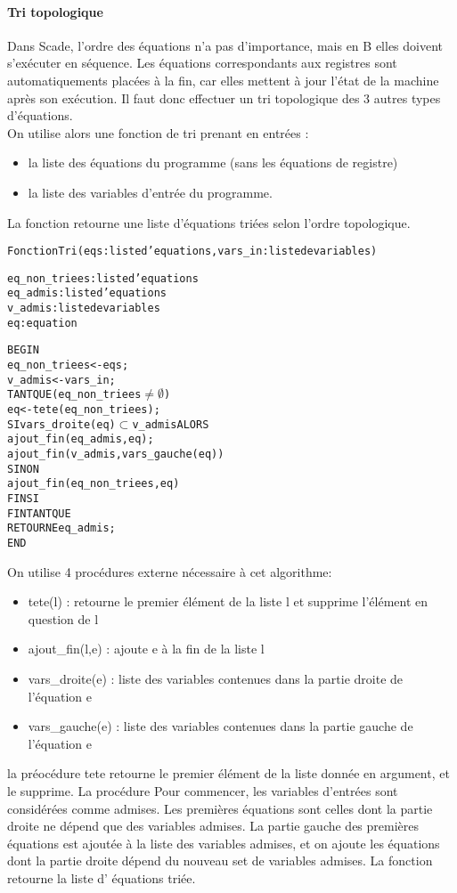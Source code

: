 \paragraph{Tri topologique}
Dans Scade, l'ordre des équations n'a pas d'importance, mais en B elles doivent
s'exécuter en séquence. Les équations correspondants aux registres sont
automatiquements placées à la fin, car elles mettent à jour l'état de la machine
après son exécution. Il faut donc effectuer un tri topologique des 3 autres
types d'équations.\\
On utilise alors une fonction de tri prenant en entrées :
\begin{itemize}
\item la liste des équations du programme (sans les équations de registre)
\item la liste des variables d'entrée du programme.
\end{itemize}
La fonction retourne une liste d'équations triées selon l'ordre
topologique.

\begin{alltt}
Fonction Tri (eqs: liste d'equations, vars\_in: liste de variables)

eq\_non\_triees : liste d'equations
eq\_admis : liste d'equations
v\_admis : liste de variables 
eq : equation

BEGIN
 eq\_non\_triees <- eqs;
 v\_admis <- vars\_in;
 TANT QUE (eq\_non\_triees \(\neq \emptyset \)) 
    eq <- tete(eq\_non\_triees);
    SI vars\_droite(eq) \(\subset\) v\_admis ALORS
       ajout\_fin(eq\_admis, eq);
       ajout\_fin(v\_admis, vars\_gauche(eq))
    SINON
       ajout\_fin(eq\_non\_triees, eq)
    FIN SI
 FIN TANT QUE
 RETOURNE eq\_admis;
END

\end{alltt}

On utilise 4 procédures externe nécessaire à cet algorithme:
\begin{itemize}
\item tete(l) : retourne le premier élément de la liste l et supprime l'élément
  en question de l
\item ajout\_fin(l,e) : ajoute e à la fin de la liste l
\item vars\_droite(e) : liste des variables contenues dans la partie droite de
  l'équation e
\item vars\_gauche(e) : liste des variables contenues dans la partie gauche de
  l'équation e
\end{itemize}
la préocédure tete retourne le premier élément de la liste donnée en argument,
et le supprime. La procédure 
Pour commencer, les variables d'entrées sont considérées comme admises. Les
premières équations sont celles dont la partie droite ne dépend que des
variables admises. La partie gauche des premières équations est ajoutée à la
liste des variables admises, et on ajoute les équations dont la partie droite
dépend du nouveau set de variables admises. La fonction retourne la liste d'
équations triée.

